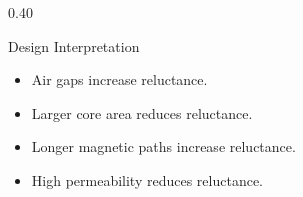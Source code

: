 \begin{frame}
\begin{columns}
\begin{column}{0.40\textwidth}
\begin{block}{Design Interpretation}
            \end{block} 
            \vspace{0.2cm} 
            \begin{itemize} 
                \small 
                \item Air gaps increase reluctance. 
                \item Larger core area reduces reluctance. 
                \item Longer magnetic paths increase reluctance. 
                \item High permeability reduces reluctance. 
            \end{itemize} 
            \vspace{0.15cm}
        \end{column} 
    \end{columns} 
\end{frame}


